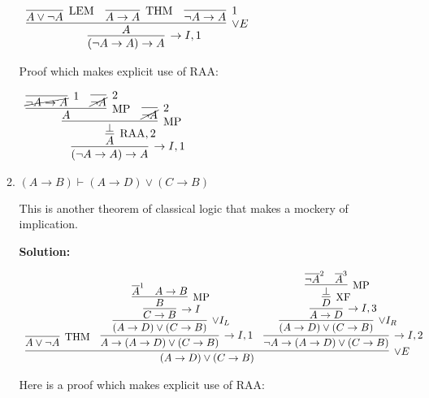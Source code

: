 \documentclass[11pt]{report}
\newcommand{\temp}[2]{{\overline{#2}}^{#1}}
\begin{document}
\begin{enumerate}
\begin{enumerate}
		\begin{center}
			$\begin{array}{c}
				\infer[\to I,1]{(\lnot A \to A) \to A}
					{\infer[\lor E]{A}
						{\infer[\LEM]{A \lor \lnot A}{}
						&
						\infer[\THM]{A \to A}{}
						&
						\infer[1]{\lnot A \to A}{}}}
			\end{array}$
		\end{center}

		Proof which makes explicit use of RAA: 

		\begin{center}
			$\begin{array}{c}
				\infer[\to I,1]{(\lnot A \to A) \to A}
					{\infer[\RAA,2]{A}
						{\infer[\MP]{\bot}
							{\infer[\MP]{A}
								{\infer[1]{\cancel{\lnot A \to A}}{} & \infer[2]{\cancel{\lnot A}}{}} 
							&
							\infer[2]{\cancel{\lnot A}}{}}}}
			\end{array}$
		\end{center}		
		
		\item $(A \to B)  \vdash (A \rightarrow  D) \lor (C \rightarrow B)$
		
		This is another theorem of classical logic that makes a mockery of implication. 
		
		\textbf{Solution:}

		\begin{tiny}
		\begin{center}
			$\begin{array}{c}
				\infer[\lor E]{(A \to D) \lor (C \to B)}
					{\infer[\THM]{A \lor \lnot A}{}
					&
					\infer[\to I,1]{A \to (A \to D) \lor (C \to B)}
						{\infer[\lor I_{L}]{(A \to D) \lor (C \to B)}
							{\infer[\to I]{C \to B}
								{\infer[\MP]{B}
									{\temp{1}{A}
									&
									A \to B}}}}
					&
					\infer[\to I,2]{\lnot A \to (A \to D) \lor (C \to B)}
						{\infer[\lor I_{R}]{(A \to D) \lor (C \to B)}
							{\infer[\to I,3]{A \to D}
								{\infer[\XF]{D}
									{\infer[\MP]{\bot}
										{\temp{2}{\lnot A}
										&
										\temp{3}{A}}}}}}}
			\end{array}$
		\end{center}
	\end{tiny}

		Here is a proof which makes explicit use of RAA: 


\end{enumerate}
\end{enumerate}
\end{document}
